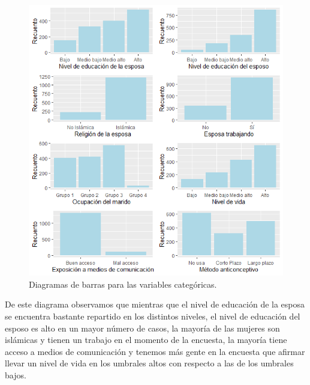 \documentclass[a4paper,12pt, oneside]{book}
\begin{document}
\begin{figure}[H]
\centering
\includegraphics[scale=0.7]{images/barplot_contraceptive.png}
\caption{Diagramas de barras para las variables categóricas.}
\end{figure}

De este diagrama observamos que mientras que el nivel de educación de la esposa se encuentra bastante repartido en los distintos niveles, el nivel de educación del esposo es alto en un mayor número de casos, la mayoría de las mujeres son islámicas y tienen un trabajo en el momento de la encuesta, la mayoría tiene acceso a medios de comunicación y tenemos más gente en la encuesta que afirmar llevar un nivel de vida en los umbrales altos con respecto a las de los umbrales bajos.
\end{document}
